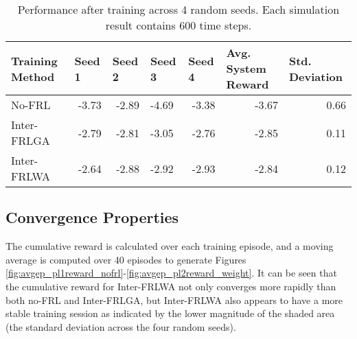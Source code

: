 \begin{table}[H]
  \centering
  \scriptsize
  \caption{Performance after training across 4 random seeds. Each simulation result contains 600 time steps.}
    \begin{tabular}{lrrlrrr} \toprule
    \textbf{Training Method} & \multicolumn{1}{l}{\textbf{Seed 1}} & \multicolumn{1}{l}{\textbf{Seed 2}} & \multicolumn{1}{l}{\textbf{Seed 3}} & \multicolumn{1}{l}{\textbf{Seed 4}} & \multicolumn{1}{l}{\textbf{Avg. System Reward}} & \multicolumn{1}{l}{\textbf{Std. Deviation}} \\ \midrule
    No-FRL & -3.73 & -2.89 & -4.69 & -3.38 & -3.67 & 0.66 \\
    Inter-FRLGA & -2.79 & -2.81 & -3.05 & -2.76 & -2.85 & 0.11 \\
    Inter-FRLWA & -2.64 & -2.88 & -2.92 & -2.93 & -2.84 & 0.12 \\ \bottomrule
    \end{tabular}%
  \label{tab:interfrl-summary}%
\end{table}%

 \subsection{Convergence Properties}
The cumulative reward is calculated over each training episode, and a moving average
is computed over 40 episodes to generate Figures
\ref{fig:avgep_pl1reward_nofrl}-\ref{fig:avgep_pl2reward_weight}.  It can be seen that
the cumulative reward for Inter-FRLWA not only converges more rapidly than both no-FRL
and Inter-FRLGA, but Inter-FRLWA also appears to have a more stable training session as
indicated by the lower magnitude of the shaded area (the standard deviation across the
four random seeds).

